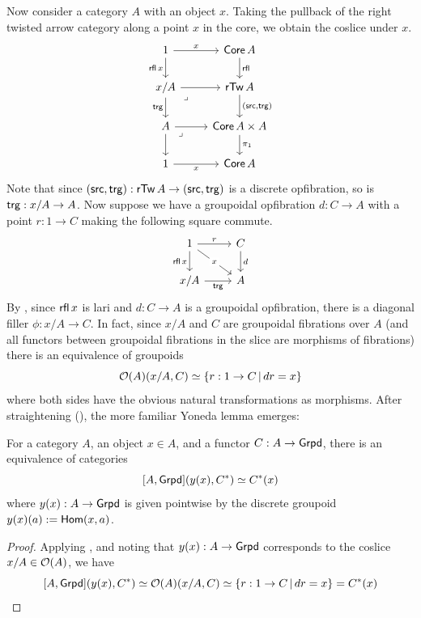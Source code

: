 Now consider a category $A$ with an object $x$.
Taking the pullback of the right twisted arrow category
along a point $x$ in the core,
we obtain the coslice under $x$.
\[
\begin{tikzcd}
	1 & {\Core{A}} \\
	{x /A} & {\rTw{A}} \\
	A & {\Core{A} \times A} \\
	1 & {\Core{A}}
	\arrow["x", from=1-1, to=1-2]
	\arrow["{\rfl x}"', from=1-1, to=2-1]
	\arrow["\rfl", from=1-2, to=2-2]
	\arrow[from=2-1, to=2-2]
	\arrow["\trg"', from=2-1, to=3-1]
	\arrow["\lrcorner"{anchor=center, pos=0.125}, draw=none, from=2-1, to=3-2]
	\arrow["{(\src,\trg)}", from=2-2, to=3-2]
	\arrow[from=3-1, to=3-2]
	\arrow[from=3-1, to=4-1]
	\arrow["\lrcorner"{anchor=center, pos=0.125}, draw=none, from=3-1, to=4-2]
	\arrow["{\pi_1}", from=3-2, to=4-2]
	\arrow["x"', from=4-1, to=4-2]
\end{tikzcd}
\]
Note that since $(\mathop{\mathsf{src}}, \mathop{\mathsf{trg}}) : \mathop{\mathsf{rTw}} A \to (\mathop{\mathsf{src}}, \mathop{\mathsf{trg}})$
is a discrete opfibration,
so is $\mathop{\mathsf{trg}} : x / A \to A$.
Now suppose we have a groupoidal opfibration $d : C \to A$
with a point $r : 1 \to C$ making the following square commute.
\[ \begin{tikzcd}
	1 & C \\
	{x / A} & A
	\arrow["r", from=1-1, to=1-2]
	\arrow["x"{description}, from=1-1, to=2-2]
	\arrow["{\rfl x}"', from=1-1, to=2-1]
	\arrow["d", from=1-2, to=2-2]
	\arrow["\trg"', from=2-1, to=2-2]
\end{tikzcd} \]
By ,
since $\mathop{\mathsf{rfl}} x$ is lari and $d : C \to A$
is a groupoidal opfibration,
there is a diagonal filler $\phi : x / A \to C$.
In fact, since $x / A$ and $C$
are groupoidal fibrations over $A$
(and all functors between groupoidal fibrations
in the slice are morphisms of fibrations)
there is an equivalence of groupoids
\[ {\mathcal{O}}(A)(x / A, C) \simeq \{r : 1 \to C \,|\, d r = x\} \]
where both sides have the obvious natural transformations as morphisms.
After straightening (),
the more familiar Yoneda lemma emerges:

\begin{proposition}
  For a category $A$, an object $x \in A$,
  and a functor $C : A \to \mathsf{Grpd}$,
  there is an equivalence of categories
  \[ [A,\mathsf{Grpd}](y (x), C^*) \simeq C^*(x)\]
  where $y(x) : A \to \mathsf{Grpd}$ is given pointwise by the discrete groupoid
  $y(x)(a) := \mathsf{Hom} (x,a)$.
\end{proposition}
\begin{proof}
  Applying ,
  and noting that $y(x) : A \to \mathsf{Grpd}$ corresponds to the coslice $x / A \in {\mathcal{O}}(A)$,
  we have 
  \[ [A,\mathsf{Grpd}](y (x), C^*) \simeq
  {\mathcal{O}}(A)(x / A, C) \simeq \{r : 1 \to C \,|\, d r = x\}
  = C^*(x) \]
\end{proof}
